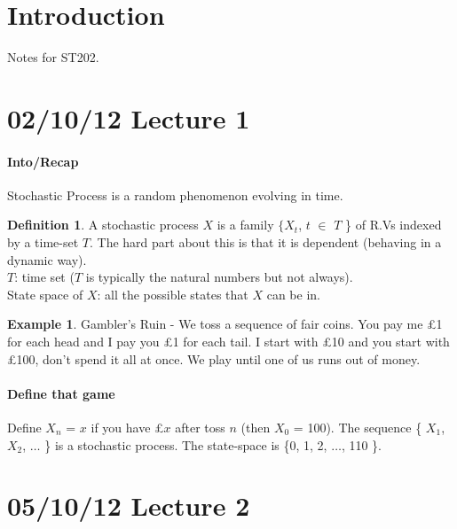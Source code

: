 \documentclass{article}
\theoremstyle{definition}
\newtheorem{defn}[thm]{Definition}
\newtheorem{ex}[thm]{Example}
\begin{document}
\maketitle
\tableofcontents

\section{Introduction}
Notes for ST202.
\clearpage

\section{02/10/12 Lecture 1}

\paragraph*{Into/Recap}

Stochastic Process is a random phenomenon evolving in time.

\begin{defn} A stochastic process $X$ is a family $\{ X_t$, $t$ $\in$ $T$ \} of R.Vs indexed by a time-set $T$. The hard part about this is that it is dependent (behaving in a dynamic way).\\

$T$: time set ($T$ is typically the natural numbers but not always).\\

State space of $X$: all the possible states that $X$ can be in.\\
\end{defn}

\begin{ex}
Gambler's Ruin - We toss a sequence of fair coins. You pay me \pounds1 for each head and I pay you \pounds1 for each tail. I start with \pounds10 and you start with \pounds100, don't spend it all at once. We play until one of us runs out of money.

\paragraph*{Define that game}

Define $X_n$ = $x$ if you have \pounds$x$ after toss $n$ (then $X_0$ = 100). The sequence \{ $X_1$, $X_2$, $\ldots$ \} is a stochastic process. The state-space is \{0, 1, 2, $\ldots$, 110 \}.
\end{ex}

\section{05/10/12 Lecture 2}
\end{document}
